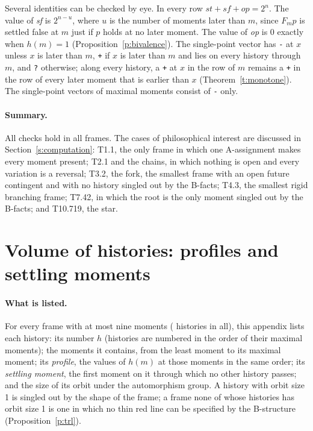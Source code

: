 \documentclass{situationist-preprint}
\begin{document}
Several identities can be checked by eye. In every row $\mathit{st} + \mathit{sf} + \mathit{op} = 2^n$. The value of \emph{sf} is $2^{n-u}$, where $u$ is the number of moments later than $m$, since $F_m p$ is settled false at $m$ just if $p$ holds at no later moment. The value of \emph{op} is $0$ exactly when $h(m) = 1$ (Proposition~\ref{p:bivalence}). The single-point vector has \texttt{-} at $x$ unless $x$ is later than $m$, \texttt{+} if $x$ is later than $m$ and lies on every history through $m$, and \texttt{?} otherwise; along every history, a \texttt{+} at $x$ in the row of $m$ remains a \texttt{+} in the row of every later moment that is earlier than $x$ (Theorem~\ref{t:monotone}). The single-point vectors of maximal moments consist of \texttt{-} only.

\paragraph{Summary.} All checks hold in all \NFramesDetail{} frames. The cases of philosophical interest are discussed in Section~\ref{s:computation}: T1.1, the only frame in which one A-assignment makes every moment present; T2.1 and the chains, in which nothing is open and every variation is a reversal; T3.2, the fork, the smallest frame with an open future contingent and with no history singled out by the B-facts; T4.3, the smallest rigid branching frame; T7.42, in which the root is the only moment singled out by the B-facts; and T10.719, the star.



\section{Volume of histories: profiles and settling moments}\label{app:histories}

\paragraph{What is listed.} For every frame with at most nine moments (\NHistRows{} histories in all), this appendix lists each history: its number $h$ (histories are numbered in the order of their maximal moments); the moments it contains, from the least moment to its maximal moment; its \emph{profile}, the values of $h(m)$ at those moments in the same order; its \emph{settling moment}, the first moment on it through which no other history passes; and the size of its orbit under the automorphism group. A history with orbit size 1 is singled out by the shape of the frame; a frame none of whose histories has orbit size 1 is one in which no thin red line can be specified by the B-structure (Proposition~\ref{p:trl}).
\end{document}
